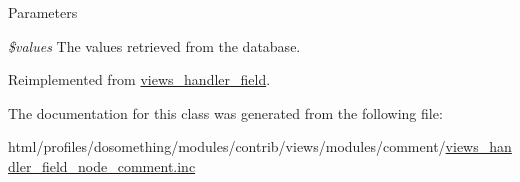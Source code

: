 \begin{DoxyParams}{Parameters}
\item[{\em \$values}]The values retrieved from the database. \end{DoxyParams}


Reimplemented from \hyperlink{classviews__handler__field_a82ff951c5e9ceb97b2eab86f880cbc1e}{views\_\-handler\_\-field}.

The documentation for this class was generated from the following file:\begin{DoxyCompactItemize}
\item 
html/profiles/dosomething/modules/contrib/views/modules/comment/\hyperlink{views__handler__field__node__comment_8inc}{views\_\-handler\_\-field\_\-node\_\-comment.inc}\end{DoxyCompactItemize}
